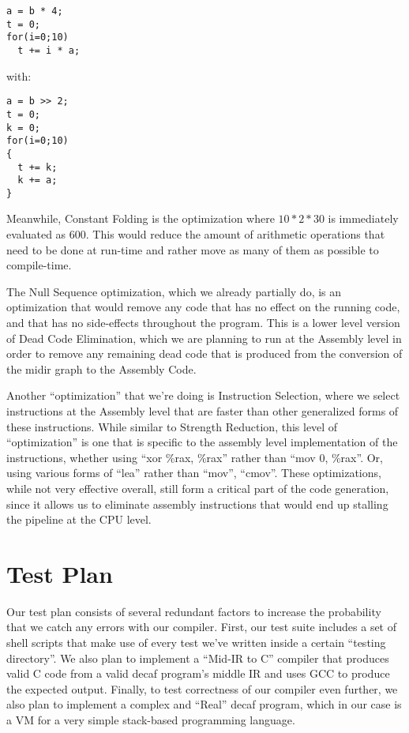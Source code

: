 \documentclass[11pt]{article}
\begin{document}
\begin{verbatim}
a = b * 4;
t = 0;
for(i=0;10)
  t += i * a;
\end{verbatim}

with:\\

\begin{verbatim}
a = b >> 2;
t = 0;
k = 0;
for(i=0;10)
{
  t += k;
  k += a;
}
\end{verbatim}

Meanwhile, Constant Folding is the optimization where $10*2*30$ is
immediately evaluated as $600$. This would reduce the amount of
arithmetic operations that need to be done at run-time and rather move
as many of them as possible to compile-time.

The Null Sequence optimization, which we already partially do, is an
optimization that would remove any code that has no effect on the
running code, and that has no side-effects throughout the
program. This is a lower level version of Dead Code Elimination, which
we are planning to run at the Assembly level in order to remove any
remaining dead code that is produced from the conversion of the midir
graph to the Assembly Code.

Another ``optimization'' that we're doing is Instruction Selection,
where we select instructions at the Assembly level that are faster
than other generalized forms of these instructions. While similar to
Strength Reduction, this level of ``optimization'' is one that is
specific to the assembly level implementation of the instructions,
whether using ``xor \%rax, \%rax'' rather than ``mov 0, \%rax''. Or,
using various forms of ``lea'' rather than ``mov'', ``cmov''.  These
optimizations, while not very effective overall, still form a critical
part of the code generation, since it allows us to eliminate assembly
instructions that would end up stalling the pipeline at the CPU level.

\section {Test Plan}
\label{sec:test}

Our test plan consists of several redundant factors to increase the
probability that we catch any errors with our compiler. First, our
test suite includes a set of shell scripts that make use of every test
we've written inside a certain ``testing directory''. We also plan to
implement a ``Mid-IR to C'' compiler that produces valid C code from a
valid decaf program's middle IR and uses GCC to produce the expected
output. Finally, to test correctness of our compiler even further, we
also plan to implement a complex and ``Real'' decaf program, which in
our case is a VM for a very simple stack-based programming language.
\end{document}
